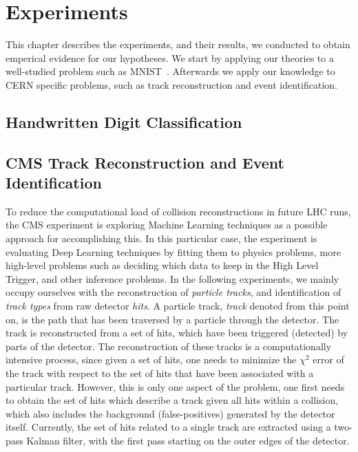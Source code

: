 %
%
%

\chapter{Experiments}
\label{chapter:experiments}

This chapter describes the experiments, and their results, we conducted to obtain emperical evidence for our hypotheses. We start by applying our theories to a well-studied problem such as MNIST~\cite{mnist}. Afterwards we apply our knowledge to CERN specific problems, such as track reconstruction and event identification.

\section{Handwritten Digit Classification}
\label{sec:experiment_mnist}

\section{CMS Track Reconstruction and Event Identification}
\label{sec:experiment_track_reconstruction}

To reduce the computational load of collision reconstructions in future LHC runs, the CMS experiment is exploring Machine Learning techniques as a possible approach for accomplishing this. In this particular case, the experiment is evaluating Deep Learning techniques by fitting them to physics problems, more high-level problems such as deciding which data to keep in the High Level Trigger, and other inference problems. In the following experiments, we mainly occupy ourselves with the reconstruction of \emph{particle tracks}, and identification of \emph{track types} from raw detector \emph{hits}. A particle track, \emph{track} denoted from this point on, is the path that has been traversed by a particle through the detector. The track is reconstructed from a set of hits, which have been triggered (detected) by parts of the detector. The reconstruction of these tracks is a computationally intensive process, since given a set of hits, one needs to minimize the $\chi^2$ error of the track with respect to the set of hits that have been associated with a particular track. However, this is only one aspect of the problem, one first needs to obtain the set of hits which describe a track given all hits within a collision, which also includes the background (false-positives) generated by the detector itself. Currently, the set of hits related to a single track are extracted using a two-pass Kalman filter, with the first pass starting on the outer edges of the detector.\\

